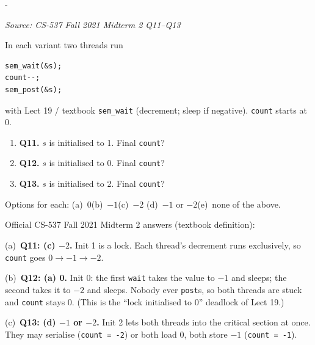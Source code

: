 \documentclass[11pt,a4paper]{article}
\makeatletter
\newcommand{\keepspace}[1]{\par\penalty-100\begingroup
  \setlength{\dimen@}{#1}\dimen@ii\pagegoal\advance\dimen@ii-\pagetotal
  \ifdim\dimen@>\dimen@ii\ifdim\dimen@ii>\z@\vfil\fi\break\fi\endgroup}
\newcounter{qn}[section]
\newenvironment{Qn}[4]{%
  \refstepcounter{qn}\keepspace{7\baselineskip}%
  \begin{tcolorbox}[qboxstyle, title={Q\thesection.\theqn\ \ [#1 \textbar\ #2]\ \ #4}]%
  {\footnotesize\color{g3}\textit{Source: #3}}\par\smallskip%
}{%
  \end{tcolorbox}%
}
\newenvironment{Sol}{%
  \begin{tcolorbox}[sboxstyle, title={Solution}]%
}{%
  \end{tcolorbox}\vspace{0.35em}%
}
\makeatother
\begin{document}
\begin{Qn}{Medium}{Lect 19}{CS-537 Fall 2021 Midterm 2 Q11--Q13}{Semaphore as a lock: init 1, 0, and 2}
In each variant two threads run
\begin{lstlisting}[numbers=none]
sem_wait(&s);
count--;
sem_post(&s);
\end{lstlisting}
with Lect 19 / textbook \texttt{sem\_wait} (decrement; sleep if
negative). \texttt{count} starts at 0.

\begin{enumerate}
  \item[(a)] \textbf{Q11.} $s$ is initialised to 1. Final \texttt{count}?
  \item[(b)] \textbf{Q12.} $s$ is initialised to 0. Final \texttt{count}?
  \item[(c)] \textbf{Q13.} $s$ is initialised to 2. Final \texttt{count}?
\end{enumerate}
Options for each: (a)~0\quad (b)~$-1$\quad (c)~$-2$\quad
(d)~$-1$ or $-2$\quad (e)~none of the above.
\end{Qn}
\begin{Sol}
Official CS-537 Fall 2021 Midterm 2 answers (textbook definition):

(a)~\textbf{Q11: (c) $-2$.} Init 1 is a lock. Each thread's decrement
runs exclusively, so \texttt{count} goes $0\to -1\to -2$.

(b)~\textbf{Q12: (a) 0.} Init 0: the first \texttt{wait} takes the
value to $-1$ and sleeps; the second takes it to $-2$ and sleeps. Nobody
ever \texttt{post}s, so both threads are stuck and \texttt{count}
stays 0. (This is the ``lock initialised to 0'' deadlock of Lect 19.)

(c)~\textbf{Q13: (d) $-1$ or $-2$.} Init 2 lets both threads into the
critical section at once. They may serialise (\texttt{count = -2}) or
both load 0, both store $-1$ (\texttt{count = -1}).
\end{Sol}
\end{document}
